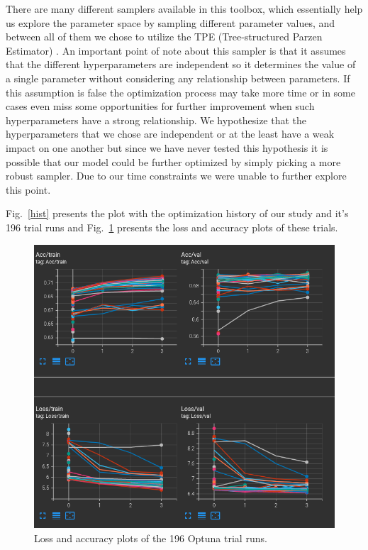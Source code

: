 There are many different samplers available in this toolbox, which essentially help us explore the parameter space by sampling different parameter values, and between all of them we chose to utilize the TPE (Tree-structured Parzen Estimator) \citep{tpe}.  
An important point of note about this sampler is that it assumes that the different hyperparameters are independent so it determines the value of a single parameter without considering any relationship between parameters. If this assumption is false the optimization  process may take more time or in some cases even miss some opportunities for further improvement when such hyperparameters have a strong relationship. We hypothesize that the hyperparameters that we chose are  independent or at the least have a weak impact on one another but since we have never tested this hypothesis it is possible that our model could be further optimized by simply picking a more robust sampler. Due to our time constraints we were unable to further explore this point.




Fig.~\ref{hist} presents the plot with the optimization history of our study and it's 196 trial runs and Fig.~\ref{optuna_all_runs} presents the loss and accuracy plots of these trials.

\begin{figure}[!ht]
\centerline{\includegraphics[scale=0.6]{figuras/optuna_all_glove_runs.png}   }
\caption{Loss and accuracy plots of the 196 Optuna trial runs.}
\label{optuna_all_runs}
\end{figure}


